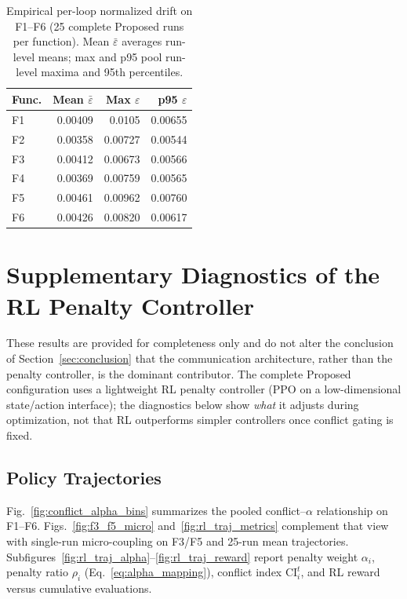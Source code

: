 \documentclass[conference]{IEEEtran}
\begin{document}
\begin{table}[!t]
\centering
\scriptsize
\caption{Empirical per-loop normalized drift on F1--F6 (25 complete Proposed runs per function). Mean $\bar\varepsilon$ averages run-level means; max and p95 pool run-level maxima and 95th percentiles.}
\label{tab:empirical_drift}
\setlength{\tabcolsep}{3pt}
\begin{tabular}{@{}lrrr@{}}
\toprule
Func. & Mean $\bar\varepsilon$ & Max $\varepsilon$ & p95 $\varepsilon$ \\
\midrule
F1 & 0.00409 & 0.0105 & 0.00655 \\
F2 & 0.00358 & 0.00727 & 0.00544 \\
F3 & 0.00412 & 0.00673 & 0.00566 \\
F4 & 0.00369 & 0.00759 & 0.00565 \\
F5 & 0.00461 & 0.00962 & 0.00760 \\
F6 & 0.00426 & 0.00820 & 0.00617 \\
\bottomrule
\end{tabular}
\end{table}

\section{Supplementary Diagnostics of the RL Penalty Controller}\label{app:rl_controller}
These results are provided for completeness only and do not alter the conclusion of Section~\ref{sec:conclusion} that the communication architecture, rather than the penalty controller, is the dominant contributor. The complete Proposed configuration uses a lightweight RL penalty controller (PPO on a low-dimensional state/action interface); the diagnostics below show \emph{what} it adjusts during optimization, not that RL outperforms simpler controllers once conflict gating is fixed.

\subsection{Policy Trajectories}\label{app:rl_traj}
Fig.~\ref{fig:conflict_alpha_bins} summarizes the pooled conflict--$\alpha$ relationship on F1--F6. Figs.~\ref{fig:f3_f5_micro} and~\ref{fig:rl_traj_metrics} complement that view with single-run micro-coupling on F3/F5 and 25-run mean trajectories. Subfigures~\ref{fig:rl_traj_alpha}--\ref{fig:rl_traj_reward} report penalty weight $\alpha_i$, penalty ratio $\rho_i$ (Eq.~\eqref{eq:alpha_mapping}), conflict index $\mathrm{CI}_i^t$, and RL reward versus cumulative evaluations.
\end{document}
